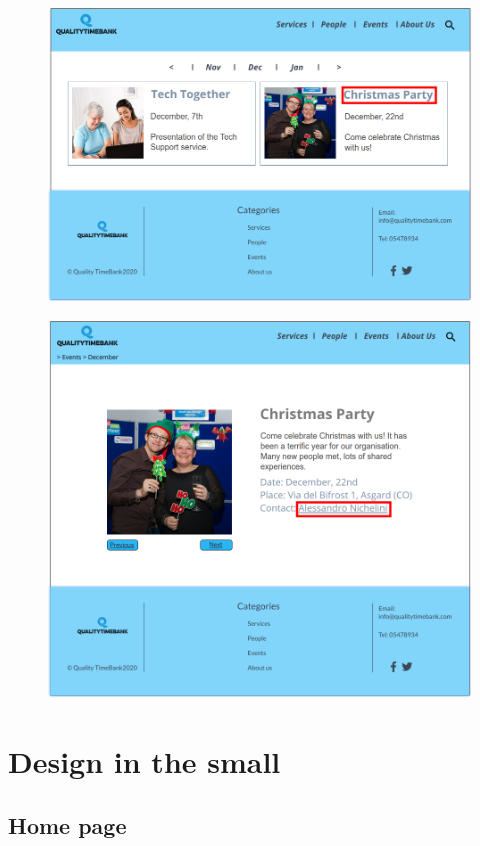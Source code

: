 \documentclass[a4paper, 11pt, parskip=half, headsepline]{scrreprt}
\begin{document}
\begin{figure}[H]
\begin{minipage}[t]{0.5\textwidth}
        \centering
    	\includegraphics[width=0.9\linewidth, keepaspectratio]{scenarios/scenario-32}
    	\caption{}
    	\label{fig:scenario-32}
    \end{minipage}
\end{figure}

\begin{figure}[H]
    \centering
	\includegraphics[width=0.4\linewidth, keepaspectratio]{scenarios/scenario-33}
	\caption{}
	\label{fig:scenario-33}
\end{figure}

\chapter{Design in the small}

\section{Home page}
\end{document}
